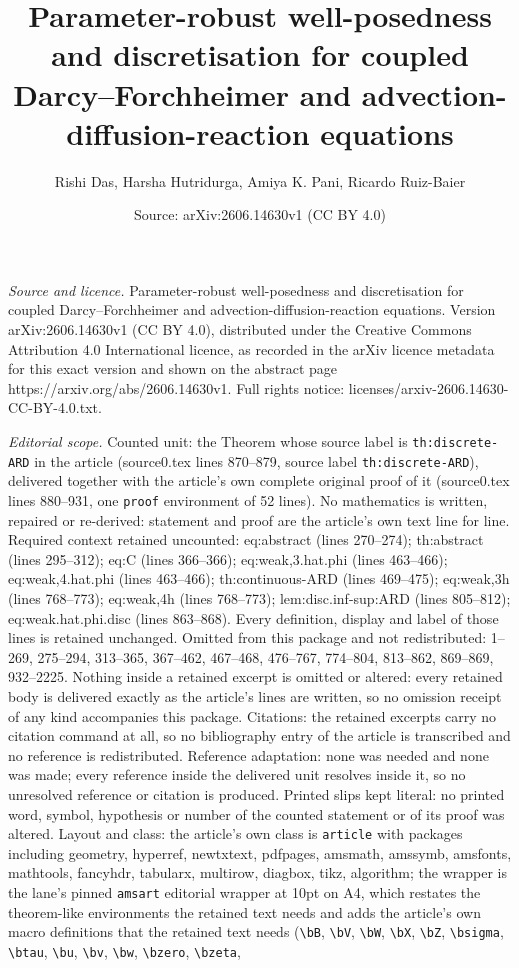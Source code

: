 \documentclass[10pt,a4paper]{amsart}
\title[Parameter-robust well-posedness and discretisation for coupl]{Parameter-robust well-posedness and discretisation for coupled Darcy--Forchheimer and advection-diffusion-reaction equations}
\author{Rishi Das, Harsha Hutridurga, Amiya K. Pani, Ricardo Ruiz-Baier}
\date{Source: arXiv:2606.14630v1 (CC BY 4.0)}
\begin{document}
\maketitle

\noindent\emph{Source and licence.} Parameter-robust well-posedness and discretisation for coupled Darcy--Forchheimer and advection-diffusion-reaction equations. Version arXiv:2606.14630v1 (CC BY 4.0), distributed under the Creative Commons Attribution 4.0 International licence, as recorded in the arXiv licence metadata for this exact version and shown on the abstract page https://arxiv.org/abs/2606.14630v1. Full rights notice: licenses/arxiv-2606.14630-CC-BY-4.0.txt.\par\smallskip

\noindent\textit{Editorial scope.} Counted unit: the Theorem whose source label is \texttt{th:discrete-ARD} in the article (source0.tex lines 870--879, source label \texttt{th:discrete-ARD}), delivered together with the article's own complete original proof of it (source0.tex lines 880--931, one \texttt{proof} environment of 52 lines). No mathematics is written, repaired or re-derived: statement and proof are the article's own text line for line. Required context retained uncounted: eq:abstract (lines 270--274); th:abstract (lines 295--312); eq:C (lines 366--366); eq:weak,3.hat.phi (lines 463--466); eq:weak,4.hat.phi (lines 463--466); th:continuous-ARD (lines 469--475); eq:weak,3h (lines 768--773); eq:weak,4h (lines 768--773); lem:disc.inf-sup:ARD (lines 805--812); eq:weak.hat.phi.disc (lines 863--868). Every definition, display and label of those lines is retained unchanged. Omitted from this package and not redistributed: 1--269, 275--294, 313--365, 367--462, 467--468, 476--767, 774--804, 813--862, 869--869, 932--2225. Nothing inside a retained excerpt is omitted or altered: every retained body is delivered exactly as the article's lines are written, so no omission receipt of any kind accompanies this package. Citations: the retained excerpts carry no citation command at all, so no bibliography entry of the article is transcribed and no reference is redistributed. Reference adaptation: none was needed and none was made; every reference inside the delivered unit resolves inside it, so no unresolved reference or citation is produced. Printed slips kept literal: no printed word, symbol, hypothesis or number of the counted statement or of its proof was altered. Layout and class: the article's own class is \texttt{article} with packages including geometry, hyperref, newtxtext, pdfpages, amsmath, amssymb, amsfonts, mathtools, fancyhdr, tabularx, multirow, diagbox, tikz, algorithm; the wrapper is the lane's pinned \texttt{amsart} editorial wrapper at 10pt on A4, which restates the theorem-like environments the retained text needs and adds the article's own macro definitions that the retained text needs (\texttt{\textbackslash bB}, \texttt{\textbackslash bV}, \texttt{\textbackslash bW}, \texttt{\textbackslash bX}, \texttt{\textbackslash bZ}, \texttt{\textbackslash bsigma}, \texttt{\textbackslash btau}, \texttt{\textbackslash bu}, \texttt{\textbackslash bv}, \texttt{\textbackslash bw}, \texttt{\textbackslash bzero}, \texttt{\textbackslash bzeta}, 
\end{document}
